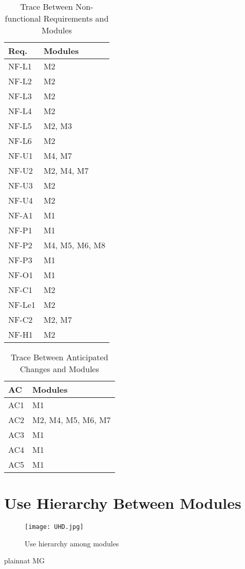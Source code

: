 \documentclass[12pt, titlepage]{article}
\begin{document}
\begin{table}[H]
\centering
\begin{tabular}{p{} p{}}
\toprule
\textbf{Req.} & \textbf{Modules}\\
\midrule
NF-L1 & M2\\
NF-L2 & M2\\
NF-L3 & M2\\
NF-L4 & M2\\
NF-L5 & M2, M3\\
NF-L6 & M2\\
NF-U1 & M4, M7\\
NF-U2 & M2, M4, M7\\
NF-U3 & M2\\
NF-U4 & M2\\
NF-A1 & M1\\
NF-P1 & M1\\
NF-P2 & M4, M5, M6, M8\\
NF-P3 & M1\\
NF-O1 & M1\\
NF-C1 & M2\\
NF-Le1 & M2\\
NF-C2 & M2, M7\\
NF-H1 & M2\\
\bottomrule
\end{tabular}
\caption{Trace Between Non-functional Requirements and Modules}
\label{TblRT}
\end{table}

\begin{table}[H]
\centering
\begin{tabular}{p{} p{}}
\toprule
\textbf{AC} & \textbf{Modules}\\
\midrule
AC1 & M1\\
AC2 & M2, M4, M5, M6, M7\\
AC3 & M1\\
AC4 & M1 \\
AC5 & M1\\
\bottomrule
\end{tabular}
\caption{Trace Between Anticipated Changes and Modules}
\label{TblACT}
\end{table}

\section{Use Hierarchy Between Modules} \label{SecUse}

\begin{figure}[H]
\centering
\texttt{[image: UHD.jpg]}
\caption{Use hierarchy among modules}
\label{FigUH}
\end{figure}
\newpage

 {plainnat}
 {MG}
\end{document}
